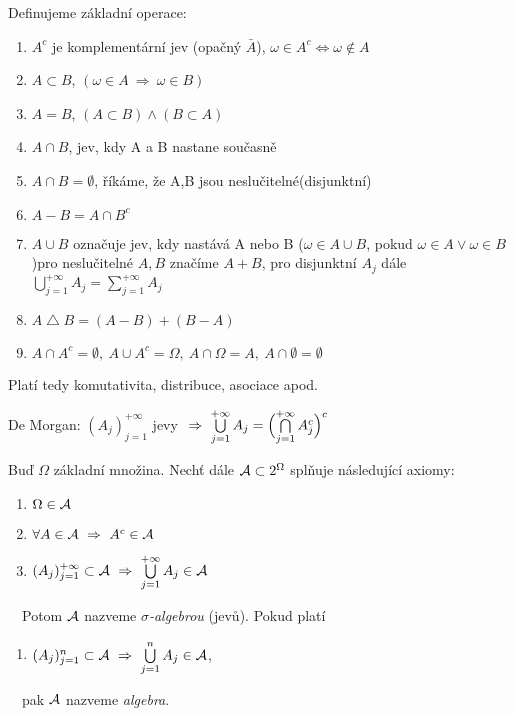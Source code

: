 \begin{theorem}
Definujeme základní operace: 
\begin{enumerate}
\item $A^c$ je komplementární jev (opačný $\bar{A}$), $\omega \in A^c \Leftrightarrow \omega \notin A$
\item $ A \subset B$, $(\omega \in A ~\Rightarrow~ \omega \in B)$
\item $ A=B$, $(A \subset B) \wedge (B \subset A)$
\item $A \cap B$, jev, kdy A a B nastane současně
\item $A \cap B = \emptyset$, říkáme, že A,B jsou neslučitelné(disjunktní)
\item $A - B = A \cap B^c$
\item $A \cup B$ označuje jev, kdy nastává A nebo B ($\omega \in A \cup B$, pokud $\omega \in A \vee \omega \in B$)\newline pro neslučitelné $A,B$  značíme $A+B$, pro disjunktní $A_j$ dále  $\bigcup\limits_{j=1}^{+\infty}  A_j = \sum\limits_{j=1}^{+\infty}A_j$
\item $A \bigtriangleup B=(A-B)+(B-A)$
\item $ A \cap A^c = \emptyset,~A\cup A^c = \Omega,~A \cap \Omega = A,~A \cap \emptyset = \emptyset $ \end{enumerate}Platí tedy komutativita, distribuce, asociace apod.
\end{theorem}
\begin{remark}
De Morgan: $(A_j)_{j=1}^{+\infty}$ jevy $~\Rightarrow~ \bigcup\limits_{j=1}^{+\infty}  A_j = \Bigl(\bigcap\limits_{j=1}^{+\infty} A_j^c\Bigr)^c $
\end{remark}
\begin{define}
 Buď $\Omega$ základní množina. Nechť dále $\mathcal{A}  \subset 2^\Omega$ splňuje následující axiomy:
 \begin{enumerate}[1)]
 	\item $\Omega \in \mathcal{A} $
	\item $\forall A \in \mathcal{A}  ~\Rightarrow~ A^c \in \mathcal{A} $
	\item $(A_j)_{j=1}^{+\infty} \subset \mathcal{A}  ~\Rightarrow~ \bigcup\limits_{j=1}^{+\infty} A_j \in \mathcal{A} $
\end{enumerate}
~~Potom $\mathcal{A} $ nazveme $\sigma$\textit{-algebrou} (jevů). Pokud platí
\begin{enumerate}[3*)]
	\item $(A_j)_{j=1}^n \subset \mathcal{A}  ~\Rightarrow~ \bigcup\limits_{j=1}^n A_j \in \mathcal{A} $,
\end{enumerate}
~~pak $\mathcal{A} $ nazveme \textit{algebra}.

\end{define}

